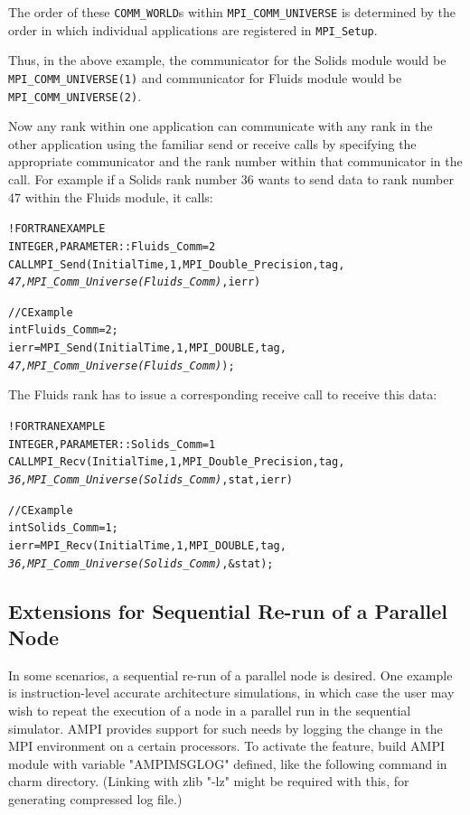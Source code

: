 \documentclass[10pt]{article}
\begin{document}
The order of these \texttt{COMM\_WORLD}s within \texttt{MPI\_COMM\_UNIVERSE}
is determined by the order in which individual applications are registered in
\texttt{MPI\_Setup}.

Thus, in the above example, the communicator for the Solids module would be
\texttt{MPI\_COMM\_UNIVERSE(1)} and communicator for Fluids module would be
\texttt{MPI\_COMM\_UNIVERSE(2)}.

Now any rank within one application can communicate with any rank in the
other application using the familiar send or receive \ampi{} calls by
specifying the appropriate communicator and the rank number within that
communicator in the call. For example if a Solids rank number 36 wants to send
data to rank number 47 within the Fluids module, it calls:

\begin{alltt}
!FORTRAN EXAMPLE
INTEGER , PARAMETER :: Fluids_Comm = 2
CALL MPI_Send(InitialTime, 1, MPI_Double_Precision, tag, 
              \emph{47, MPI_Comm_Universe(Fluids_Comm)}, ierr)

//C Example
int Fluids_Comm = 2;
ierr = MPI_Send(InitialTime, 1, MPI_DOUBLE, tag,
                \emph{47, MPI_Comm_Universe(Fluids_Comm)});
\end{alltt}

The Fluids rank has to issue a corresponding receive call to receive this
data:

\begin{alltt}
!FORTRAN EXAMPLE
INTEGER , PARAMETER :: Solids_Comm = 1
CALL MPI_Recv(InitialTime, 1, MPI_Double_Precision, tag, 
              \emph{36, MPI_Comm_Universe(Solids_Comm)}, stat, ierr)

//C Example
int Solids_Comm = 1;
ierr = MPI_Recv(InitialTime, 1, MPI_DOUBLE, tag,
                \emph{36, MPI_Comm_Universe(Solids_Comm)}, &stat);
\end{alltt}

\subsection{Extensions for Sequential Re-run of a Parallel Node}
In some scenarios, a sequential re-run of a parallel node is desired. One
example is instruction-level accurate architecture simulations, in which case
the user may wish to repeat the execution of a node in a parallel run in the
sequential simulator. AMPI provides support for such needs by logging the change
in the MPI environment on a certain processors. To activate the feature, build
AMPI module with variable "AMPIMSGLOG" defined, like the following command in
charm directory. (Linking with zlib "-lz" might be required with this, for
generating compressed log file.)
\end{document}

